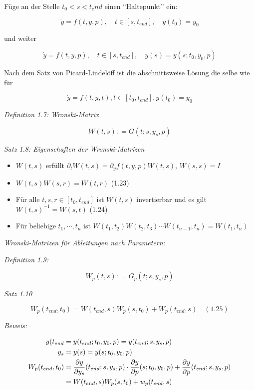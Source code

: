 
Füge an der Stelle $t_0 < s < t_end$ einen "`Haltepunkt"' ein:

\[\dot y = f(t,y,p),\quad t\in[s,t_{end}],\quad y(t_0) = y_0\]

und weiter

\[\dot y = f(t,y,p),\quad t\in[s,t_{end}],\quad y(s) = y(s; t_0, y_0, p) \]

Nach dem Satz von Picard-Lindelöff ist die abschnittsweise Lösung die selbe wie für

\[\dot y = f(t,y,t), t\in[t_0,t_{end}], y(t_0) = y_0 \]

\emph{Definition 1.7: Wronski-Matrix}

\[W(t,s) \colon= G(t; s, y_s, p) \]

\emph{Satz 1.8: Eigenschaften der Wronski-Matrizen}

\begin{itemize}
\item $W(t,s)$ erfüllt $\partial_t W(t,s) = \partial_y f(t,y,p) W(t,s)$, $W(s,s) = I$ 
\item $W(t,s) W(s,r) = W(t,r)$ (1.23)
\item Für alle $t,s,r \in [t_0, t_{end}]$ ist $W(t,s)$ invertierbar und es gilt $W(t,s)^{-1} = W(s,t)$ (1.24)
\item Für beliebige $t_1,\cdots,t_n$ ist $W(t_1,t_2)W(t_2,t_3) \cdots W(t_{n-1}, t_n) = W(t_1, t_n)$
\end{itemize}

\emph{Wronski-Matrizen für Ableitungen nach Parametern:}

\emph{Definition 1.9:}

\[ W_p(t,s) \colon= G_p(t;s,y_s,p)\]

\emph{Satz 1.10}

\[ W_p(t_{end},t_0) = W(t_{end},s) W_p(s,t_0)+W_p(t_{end},s) \quad (1.25) \]

\emph{Beweis:}

\begin{align*}
y(t_{end} &= y(t_{end}; t_0, y_0, p) = y(t_{end};s,y_s,p) \\
y_s &= y(s) = y(s; t_0,y_0,p) \\
W_p(t_{end},t_0) &= \frac{\partial y}{\partial y_s}(t_{end}; s,y_s,p) \cdot \frac{\partial y}{\partial p} (s;t_0,y_0,p) +\frac{\partial y}{\partial p}(t_{end}; s,y_s,p)\\
&= W(t_{end},s) W_p(s,t_0) + w_p(t_{end},s)
\end{align*}

